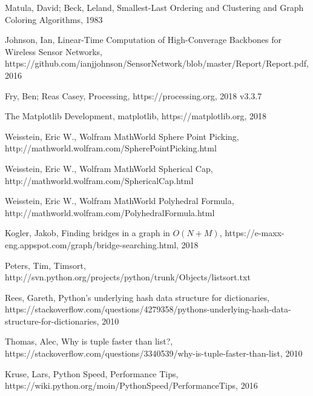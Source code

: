 \documentclass{article}
\begin{document}

\newpage

\begin{thebibliography}{10}
    Matula, David; Beck, Leland, Smallest-Last Ordering and Clustering and Graph Coloring Algorithms, 1983

    Johnson, Ian, Linear-Time Computation of High-Converage Backbones for Wireless Sensor Networks, https://github.com/ianjjohnson/SensorNetwork/blob/master/Report/Report.pdf, 2016

    Fry, Ben; Reas Casey, Processing, https://processing.org, 2018 v3.3.7

    The Matplotlib Development, matplotlib, https://matplotlib.org, 2018

    Weisstein, Eric W., Wolfram MathWorld Sphere Point Picking, http://mathworld.wolfram.com/SpherePointPicking.html

    Weisstein, Eric W., Wolfram MathWorld Spherical Cap, http://mathworld.wolfram.com/SphericalCap.html

    Weisstein, Eric W., Wolfram MathWorld Polyhedral Formula, http://mathworld.wolfram.com/PolyhedralFormula.html

    Kogler, Jakob, Finding bridges in a graph in $O(N + M)$, https://e-maxx-eng.appspot.com/graph/bridge-searching.html, 2018

    Peters, Tim, Timsort, http://svn.python.org/projects/python/trunk/Objects/listsort.txt

    Rees, Gareth, Python's underlying hash data structure for dictionaries, https://stackoverflow.com/questions/4279358/pythons-underlying-hash-data-structure-for-dictionaries, 2010

    Thomas, Alec, Why is tuple faster than list?, https://stackoverflow.com/questions/3340539/why-is-tuple-faster-than-list, 2010

    Kruse, Lars, Python Speed, Performance Tips, https://wiki.python.org/moin/PythonSpeed/PerformanceTips, 2016

\end{thebibliography}
\end{document}
